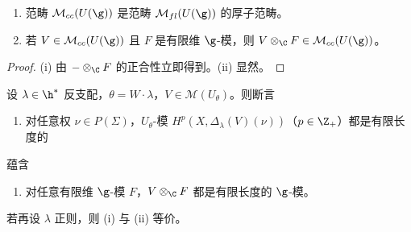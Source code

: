 \begin{lemma}\label{lem:03.7.3}
\begin{enumerate}[label=(\roman*),leftmargin=2.6em,itemsep=0.1em]
\item 范畴 $\mathcal{M}_{cc}(U(\g))$ 是范畴 $\mathcal{M}_{fl}(U(\g))$ 的厚子范畴。
\item 若 $V\in\mathcal{M}_{cc}(U(\g))$ 且 $F$ 是有限维 $\g$-模，则 $V\otimes_\C F\in\mathcal{M}_{cc}(U(\g))$。
\end{enumerate}
\end{lemma}

\begin{proof}
(i) 由 $-\otimes_\C F$ 的正合性立即得到。(ii) 显然。
\end{proof}

\begin{lemma}\label{lem:03.7.4}
设 $\lambda\in\h^*$ 反支配，$\theta=W\cdot\lambda$，$V\in\mathcal{M}(U_\theta)$。则断言
\begin{enumerate}[label=(\roman*),leftmargin=2.6em,itemsep=0.1em]
\item 对任意权 $\nu\in P(\Sigma)$，$U_\theta$-模 $H^p(X,\Delta_\lambda(V)(\nu))$（$p\in\Z_+$）都是有限长度的
\end{enumerate}
蕴含
\begin{enumerate}[label=(\roman*),leftmargin=2.6em,itemsep=0.1em,start=2]
\item 对任意有限维 $\g$-模 $F$，$V\otimes_\C F$ 都是有限长度的 $\g$-模。
\end{enumerate}
若再设 $\lambda$ 正则，则 (i) 与 (ii) 等价。
\end{lemma}

